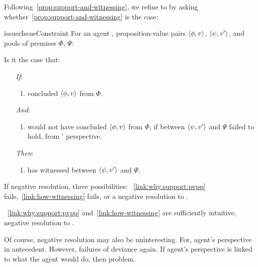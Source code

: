 \begin{note}
  Following~\autoref{prop:support-and-witnessing}, we refine \issueInclusion{} to \issueConstraint{} by asking whether~\autoref{prop:support-and-witnessing} is the case:

  \begin{restatable}[\issueConstraint{}]{issue}{rIssueConstraint}
    \label{issue:has-witnessed}
    For an agent \vAgent{}, proposition-value pairs \(\langle \phi, v \rangle\), \(\langle \psi, v' \rangle\), and pools of premises \(\Phi\), \(\Psi\):

    Is it the case that:

    \begin{enumerate}
    \item[\emph{If}:]
      \begin{enumerate}[label=\alph*., ref=(\alph*)]
      \item \vAgent{} concluded \(\langle \phi, v \rangle\) from \(\Phi\).
      \end{enumerate}
    \item[\emph{And}:]
      \begin{enumerate}[label=\alph*., ref=(\alph*), resume]
      \item
        \vAgent{} would not have concluded \(\langle \phi, v \rangle\) from \(\Phi\), if \support{} between \(\langle \psi, v' \rangle\) and \(\Psi\) failed to hold, from \vAgent{}' perspective.
      \end{enumerate}
    \item[\emph{Then}:]
      \begin{enumerate}[label=\alph*., ref=(\alph*), resume]
      \item
        \vAgent{} has witnessed \support{} between \(\langle \psi, v' \rangle\) and \(\Psi\).
      \end{enumerate}
    \end{enumerate}
  \end{restatable}

  If negative resolution, three possibilities:
  ~\autoref{link:why:support:pvpp} fails,~\autoref{link:how-witnessing} fails, or a negative resolution to \issueInclusion{}.

  ~\autoref{link:why:support:pvpp} and~\autoref{link:how-witnessing} are sufficiently intuitive, negative resolution to \issueInclusion{}.

  Of course, negative resolution may also be uninteresting.
  For, agent's perspective in antecedent.
  However, failures of deviance again.
  If agent's perspective is linked to what the agent would do, then problem.
\end{note}

